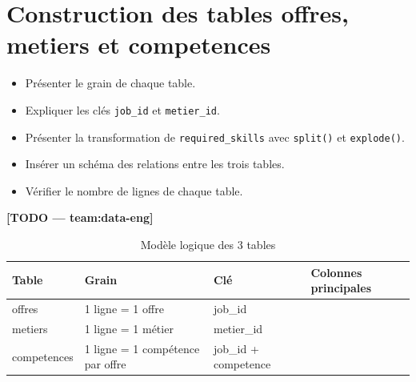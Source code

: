 \section{Construction des tables offres, metiers et competences}
\begin{itemize}
  \item Présenter le grain de chaque table.
  \item Expliquer les clés \texttt{job\_id} et \texttt{metier\_id}.
  \item Présenter la transformation de \texttt{required\_skills} avec \texttt{split()} et \texttt{explode()}.
  \item Insérer un schéma des relations entre les trois tables.
  \item Vérifier le nombre de lignes de chaque table.
\end{itemize}
\textbf{[TODO — team:data-eng]}

\begin{table}[H]
\centering
\caption{Modèle logique des 3 tables}
\begin{tabular}{lp{3.5cm}p{2.5cm}p{4cm}}
\toprule
Table & Grain & Clé & Colonnes principales \\
\midrule
offres & 1 ligne = 1 offre & job\_id & \\
metiers & 1 ligne = 1 métier & metier\_id & \\
competences & 1 ligne = 1 compétence par offre & job\_id + competence & \\
\bottomrule
\end{tabular}
\end{table}
